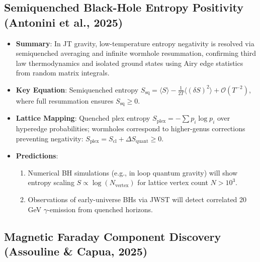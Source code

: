\documentclass[11pt,a4paper]{article}
\begin{document}
\subsection{Semiquenched Black-Hole Entropy Positivity (Antonini et al., 2025)}

\begin{itemize}
\item \textbf{Summary}: In JT gravity, low-temperature entropy negativity is resolved via semiquenched averaging and infinite wormhole resummation, confirming third law thermodynamics and isolated ground states using Airy edge statistics from random matrix integrals.

\item \textbf{Key Equation}: Semiquenched entropy $S_{\mathrm{sq}} = \langle S \rangle - \frac{1}{2T} \langle (\delta S)^2 \rangle + \mathcal{O}(T^{-2})$, where full resummation ensures $S_{\mathrm{sq}} \geq 0$.

\item \textbf{Lattice Mapping}: Quenched plex entropy $S_{\mathrm{plex}} = -\sum p_i \log p_i$ over hyperedge probabilities; wormholes correspond to higher-genus corrections preventing negativity: $S_{\mathrm{plex}} = S_{\mathrm{cl}} + \Delta S_{\mathrm{quant}} \geq 0$.

\item \textbf{Predictions}:
\begin{enumerate}
\item Numerical BH simulations (e.g., in loop quantum gravity) will show entropy scaling $S \propto \log(N_{\mathrm{vertex}})$ for lattice vertex count $N > 10^3$.
\item Observations of early-universe BHs via JWST will detect correlated 20 GeV $\gamma$-emission from quenched horizons.
\end{enumerate}
\end{itemize}

\subsection{Magnetic Faraday Component Discovery (Assouline \& Capua, 2025)}
\end{document}
